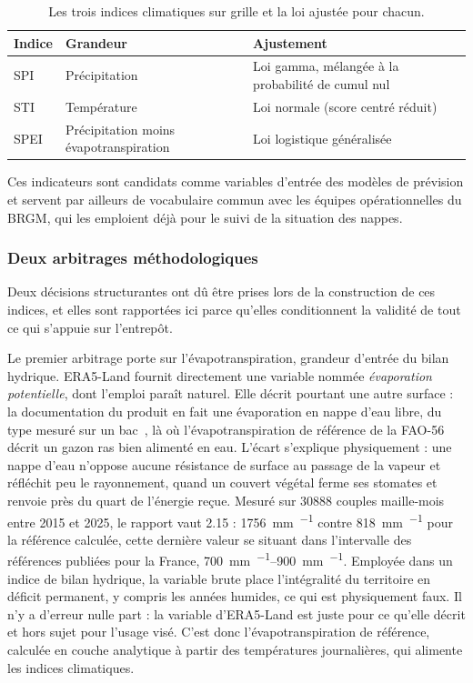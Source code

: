 \begin{table}[H]
\centering
\caption{Les trois indices climatiques sur grille et la loi ajustée pour chacun.}
\label{tab:indices-grille}
\begin{tabularx}{\textwidth}{@{}llX@{}}
\toprule
\textbf{Indice} & \textbf{Grandeur} & \textbf{Ajustement} \\
\midrule
SPI  & Précipitation & Loi gamma, mélangée à la probabilité de cumul nul \\
STI  & Température & Loi normale (score centré réduit) \\
SPEI & Précipitation moins évapotranspiration & Loi logistique généralisée \\
\bottomrule
\end{tabularx}
\end{table}

Ces indicateurs sont candidats comme variables d'entrée des modèles de prévision et servent par ailleurs de vocabulaire commun avec les équipes opérationnelles du BRGM, qui les emploient déjà pour le suivi de la situation des nappes.

\subsubsection{Deux arbitrages méthodologiques}
\label{sec:arbitrages}

Deux décisions structurantes ont dû être prises lors de la construction de ces indices, et elles sont rapportées ici parce qu'elles conditionnent la validité de tout ce qui s'appuie sur l'entrepôt.

Le premier arbitrage porte sur l'évapotranspiration, grandeur d'entrée du bilan hydrique. ERA5-Land fournit directement une variable nommée \emph{évaporation potentielle}, dont l'emploi paraît naturel. Elle décrit pourtant une autre surface : la documentation du produit en fait une évaporation en nappe d'eau libre, du type mesuré sur un bac~\cite{era5land_doc}, là où l'évapotranspiration de référence de la FAO-56~\cite{allen1998fao56} décrit un gazon ras bien alimenté en eau. L'écart s'explique physiquement : une nappe d'eau n'oppose aucune résistance de surface au passage de la vapeur et réfléchit peu le rayonnement, quand un couvert végétal ferme ses stomates et renvoie près du quart de l'énergie reçue. Mesuré sur \num{30888} couples maille-mois entre 2015 et 2025, le rapport vaut \num{2,15} : \SI{1756}{\milli\metre\per\an} contre \SI{818}{\milli\metre\per\an} pour la référence calculée, cette dernière valeur se situant dans l'intervalle des références publiées pour la France, \SIrange{700}{900}{\milli\metre\per\an}. Employée dans un indice de bilan hydrique, la variable brute place l'intégralité du territoire en déficit permanent, y compris les années humides, ce qui est physiquement faux. Il n'y a d'erreur nulle part : la variable d'ERA5-Land est juste pour ce qu'elle décrit et hors sujet pour l'usage visé. C'est donc l'évapotranspiration de référence, calculée en couche analytique à partir des températures journalières, qui alimente les indices climatiques.


